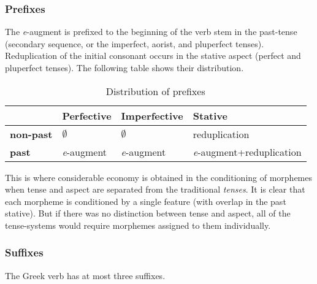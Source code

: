 \documentclass[12pt]{article}
\begin{document}
\subsubsection{Prefixes}

The \textit{e}-augment is prefixed to the beginning of the verb stem in the
past-tense (secondary sequence, or the imperfect, aorist, and pluperfect
tenses). Reduplication of the initial consonant occurs in the stative aspect
(perfect and pluperfect tenses). The following table shows their distribution.

\begin{table*}
\centering
\begin{tabular}{|l|l|l|l|}
    \hline
                        & \textbf{Perfective}   & \textbf{Imperfective} & \textbf{Stative}\\
    \hline
    \textbf{non-past}   & $\emptyset$           & $\emptyset$           & reduplication\\
    \hline
    \textbf{past}       & \textit{e}-augment    & \textit{e}-augment    & \textit{e}-augment+reduplication\\
    \hline
\end{tabular}
\caption{Distribution of prefixes}
\label{tab:prefixes}
\end{table*}

This is where considerable economy is obtained in the conditioning of morphemes
when tense and aspect are separated from the traditional \textit{tenses}. It is
clear that each morpheme is conditioned by a single feature (with overlap in
the past stative). But if there was no distinction between tense and aspect,
all of the tense-systems would require morphemes assigned to them individually.

\subsubsection{Suffixes}

The Greek verb has at most three suffixes.
\end{document}
